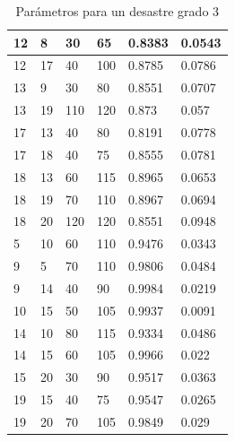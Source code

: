 \begin{table}[H]
\begin{tabular}{|l|l|l|l|l|l|}
12 & 8 & 30 & 65 & 0.8383 & 0.0543 \\ \hline
12 & 17 & 40 & 100 & 0.8785 & 0.0786 \\ \hline
13 & 9 & 30 & 80 & 0.8551 & 0.0707 \\ \hline
13 & 19 & 110 & 120 & 0.873 & 0.057 \\ \hline
17 & 13 & 40 & 80 & 0.8191 & 0.0778 \\ \hline
17 & 18 & 40 & 75 & 0.8555 & 0.0781 \\ \hline
18 & 13 & 60 & 115 & 0.8965 & 0.0653 \\ \hline
18 & 19 & 70 & 110 & 0.8967 & 0.0694 \\ \hline
18 & 20 & 120 & 120 & 0.8551 & 0.0948 \\ \hline
5 & 10 & 60 & 110 & 0.9476 & 0.0343 \\ \hline
9 & 5 & 70 & 110 & 0.9806 & 0.0484 \\ \hline
9 & 14 & 40 & 90 & 0.9984 & 0.0219 \\ \hline
10 & 15 & 50 & 105 & 0.9937 & 0.0091 \\ \hline
14 & 10 & 80 & 115 & 0.9334 & 0.0486 \\ \hline
14 & 15 & 60 & 105 & 0.9966 & 0.022 \\ \hline
15 & 20 & 30 & 90 & 0.9517 & 0.0363 \\ \hline
19 & 15 & 40 & 75 & 0.9547 & 0.0265 \\ \hline
19 & 20 & 70 & 105 & 0.9849 & 0.029 \\ \hline
\end{tabular}
\caption{Parámetros para un desastre grado 3}\label{grade3}
\end{table}


